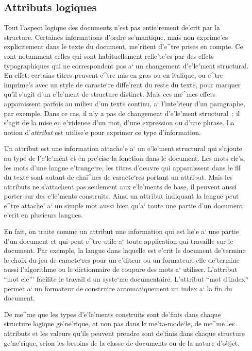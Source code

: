 \subsection{Attributs logiques}
\label{attributs}

Tout l'aspect logique des documents n'est pas entie`rement de'crit par
la structure. Certaines informations d'ordre se'mantique, mais non
exprime'es explicitement dans le texte du document, me'ritent d'e^tre prises
en compte. Ce sont notamment celles qui sont habituellement refle'te'es
par des effets typographiques qui ne correspondent pas a` un changement
d'e'le'ment structural. En effet, certains titres peuvent e^tre mis en gras
ou en italique, ou e^tre imprime's avec un style de caracte`re diffe'rent
du reste du texte, pour marquer qu'il s'agit d'un e'le'ment de structure
distinct. Mais ces me^mes effets apparaissent parfois au milieu d'un texte
continu, a` l'inte'rieur d'un paragraphe, par exemple. Dans ce cas, il n'y a
pas de changement d'e'le'ment structural~; il s'agit de la mise en e'vidence
d'un mot, d'une expression ou d'une phrase. La notion d'{\em attribut} est
utilise'e pour exprimer ce type d'information.

Un attribut est une information attache'e a` un e'le'ment structural qui
s'ajoute au type de l'e'le'ment et en pre'cise la fonction dans le document.
Les mots cle's, les mots d'une langue e'trange`re, les titres d'oeuvre qui
apparaissent dans le fil du texte sont autant de chai^nes de caracte`res
portant un attribut. Mais les attributs ne s'attachent pas seulement
aux e'le'ments de base, il peuvent aussi porter sur des e'le'ments construits.
Ainsi un attribut indiquant la langue peut e^tre attache' a` un simple mot
aussi bien qu'a` toute une partie d'un document e'crit en plusieurs langues.

En fait, on traite comme un attribut une information qui est lie'e a`
une partie d'un document et qui peut e^tre utile a` toute application qui
travaille sur le document. Par exemple, la langue dans laquelle est e'crit le
document de'termine le choix du jeu de caracte`res pour un e'diteur ou un
formateur, elle de'termine aussi l'algorithme ou le dictionnaire de coupure
des mots a` utiliser. L'attribut ``mot cle''' facilite le travail d'un
syste`me documentaire. L'attribut ``mot d'index'' permet a` un formateur de
construire automatiquement un index a` la fin du document.

De me^me que les types d'e'le'ments construits sont de'finis dans chaque
structure logique ge'ne'rique, et non pas dans le me'ta-mode`le, de me^me les
attributs et les valeurs qu'ils peuvent prendre sont de'finis dans chaque
structure ge'ne'rique, selon les besoins de la classe de documents ou de la
nature d'objet.

